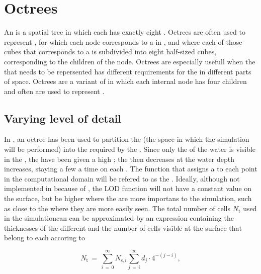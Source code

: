 \chapter{Octrees}

An \octree is a spatial tree  in which each  has exactly eight . Octrees are often used to represent , for which each node corresponds to a \cube in , and where each of those cubes that corresponds to a  is subdivided into eight half-sized cubes, corresponding to the children of the node. Octrees are especially usefull when the \data that needs to be repersented has different requirements for the \LOD in different parts of space. Octrees are a variant of \quadtrees in which each internal node has four children and often are used to represent .

\section{Varying level of detail}

In \thiswork, an octree has been used to partition the  (the space in which the simulation will be performed) into the \cells required by the \FVM. Since only the \surface of the water is visible in the \simulation, the  have been given a high \LOD; the \LOD then decreases at the water depth increases, staying a few  a time on each \LOD. The function that assigns a \LOD to each point in the computational domain will be refered to as the . Ideally, although not implemented in \thiswork because of \lackoftime, the LOD function will not have a constant value on the surface, but be higher where the  are more importans to the simulation, such as close to the \camera where they are more easily seen. The total number of cells $N_{\text{t}}$ used in the simulationcan can be approximated by an expression containing the thicknesses of the different \LODs and the number of cells visible at the surface that belong to each \LOD accoring to

\begin{equation} \label{eq:number_of_cells_total_sum}
N_{\text{t}} \,=\, \sum_{i\,=\,0}^\infty N_{\text{s},i}\sum_{j\,=\,i}^\infty d_j\cdot 4^{-(j-i)},
\end{equation}

